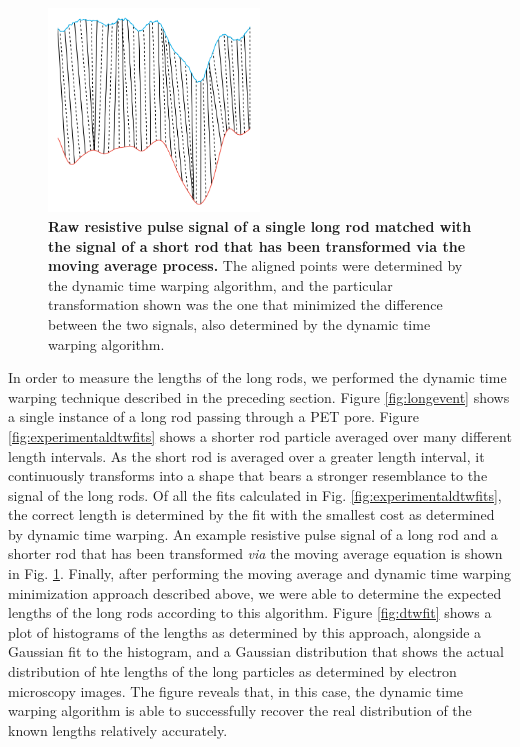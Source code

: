 		
		\begin{figure}
			\includegraphics[width=0.5\textwidth]{experimentaldtwfit.png}
			\caption{\textbf{Raw resistive pulse signal of a single long rod matched with the signal of a short rod that has been transformed via the moving average process.} The aligned points were determined by the dynamic time warping algorithm, and the particular transformation shown was the one that minimized the difference between the two signals, also determined by the dynamic time warping algorithm.}
			\label{fig:experimentaldtwfit}
		\end{figure}
		
		
		In order to measure the lengths of the long rods, we performed the dynamic time warping technique described in the preceding section. Figure \ref{fig:longevent} shows a single instance of a long rod passing through a PET pore. Figure \ref{fig:experimentaldtwfits} shows a shorter rod particle averaged over many different length intervals. As the short rod is averaged over a greater length interval, it continuously transforms into a shape that bears a stronger resemblance to the signal of the long rods. Of all the fits calculated in Fig. \ref{fig:experimentaldtwfits}, the correct length is determined by the fit with the smallest cost as determined by dynamic time warping. An example resistive pulse signal of a long rod and a shorter rod that has been transformed \textit{via} the moving average equation is shown in Fig. \ref{fig:experimentaldtwfit}. Finally, after performing the moving average and dynamic time warping minimization approach described above, we were able to determine the expected lengths of the long rods according to this algorithm. Figure \ref{fig:dtwfit} shows a plot of histograms of the lengths as determined by this approach, alongside a Gaussian fit to the histogram, and a Gaussian distribution that shows the actual distribution of hte lengths of the long particles as determined by electron microscopy images. The figure reveals that, in this case, the dynamic time warping algorithm is able to successfully recover the real distribution of the known lengths relatively accurately.
		

